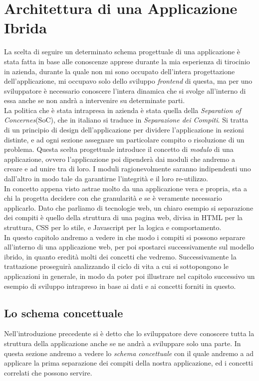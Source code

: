 \chapter{Architettura di una Applicazione Ibrida}
La scelta di seguire un determinato schema progettuale di una applicazione è stata fatta in base alle conoscenze apprese durante la mia esperienza di tirocinio in azienda, durante la quale non mi sono occupato dell'intera progettazione dell'applicazione, mi occupavo solo dello sviluppo \emph{frontend} di questa, ma per uno sviluppatore è necessario conoscere l'intera dinamica che si svolge all'interno di essa anche se non andrà a intervenire su determinate parti.\\

La politica che è stata intrapresa in azienda è stata quella della \emph{Separation of Concernes}(SoC), che in italiano si traduce in \emph{Separazione dei Compiti}. Si tratta di un principio di design dell'applicazione per dividere l'applicazione in sezioni distinte, e ad ogni sezione assegnare un particolare compito o risoluzione di un problema. Questa scelta progettuale introduce il concetto di \emph{modulo} di una applicazione, ovvero l'applicazione poi dipenderà dai moduli che andremo a creare e ad unire tra di loro. I moduli ragionevolmente saranno indipendenti uno dall'altro in modo tale da garantirne l'integrità e il loro re-utilizzo.\cite{wiki:soc}\\
In concetto appena visto astrae molto da una applicazione vera e propria, sta a chi la progetta decidere con che granularità  e se è veramente necessario applicarlo. Dato che parliamo di tecnologie web, un chiaro esempio si separazione dei compiti è quello della struttura di una pagina web, divisa in HTML per la struttura, CSS per lo stile, e Javascript per la logica e comportamento.\\

In questo capitolo andremo a vedere in che modo i compiti si possono separare all'interno di una applicazione web, per poi spostarci successivamente sul modello ibrido, in quanto eredità molti dei concetti che vedremo. Successivamente la trattazione proseguirà analizzando il ciclo di vita a cui si sottopongono le applicazioni in generale, in modo da poter poi illustrare nel capitolo successivo un esempio di sviluppo intrapreso in base ai dati e ai concetti forniti in questo. 
\section{Lo schema concettuale}
Nell'introduzione precedente si è detto che lo sviluppatore deve conoscere tutta la struttura della applicazione anche se ne andrà a sviluppare solo una parte. In questa sezione andremo a vedere lo \emph{schema concettuale} con il quale andremo a ad applicare la prima separazione dei compiti della nostra applicazione, ed i concetti correlati che possono servire.
